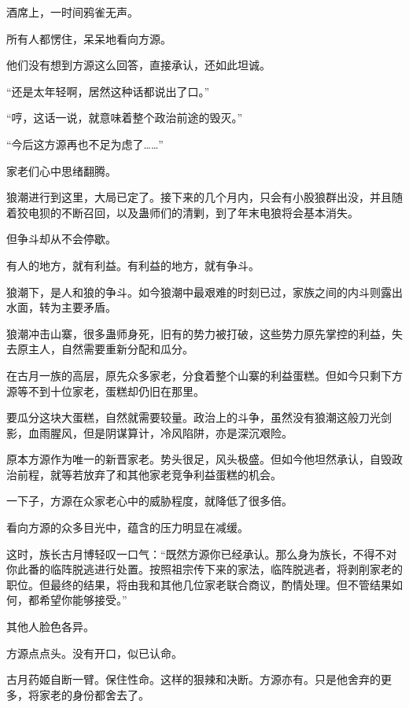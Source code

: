 
\begin{this_body}

酒席上，一时间鸦雀无声。

所有人都愣住，呆呆地看向方源。

他们没有想到方源这么回答，直接承认，还如此坦诚。

“还是太年轻啊，居然这种话都说出了口。”

“哼，这话一说，就意味着整个政治前途的毁灭。”

“今后这方源再也不足为虑了……”

家老们心中思绪翻腾。

狼潮进行到这里，大局已定了。接下来的几个月内，只会有小股狼群出没，并且随着狡电狈的不断召回，以及蛊师们的清剿，到了年末电狼将会基本消失。

但争斗却从不会停歇。

有人的地方，就有利益。有利益的地方，就有争斗。

狼潮下，是人和狼的争斗。如今狼潮中最艰难的时刻已过，家族之间的内斗则露出水面，转为主要矛盾。

狼潮冲击山寨，很多蛊师身死，旧有的势力被打破，这些势力原先掌控的利益，失去原主人，自然需要重新分配和瓜分。

在古月一族的高层，原先众多家老，分食着整个山寨的利益蛋糕。但如今只剩下方源等不到十位家老，蛋糕却仍旧在那里。

要瓜分这块大蛋糕，自然就需要较量。政治上的斗争，虽然没有狼潮这般刀光剑影，血雨腥风，但是阴谋算计，冷风陷阱，亦是深沉艰险。

原本方源作为唯一的新晋家老。势头很足，风头极盛。但如今他坦然承认，自毁政治前程，就等若放弃了和其他家老竞争利益蛋糕的机会。

一下子，方源在众家老心中的威胁程度，就降低了很多倍。

看向方源的众多目光中，蕴含的压力明显在减缓。

这时，族长古月博轻叹一口气：“既然方源你已经承认。那么身为族长，不得不对你此番的临阵脱逃进行处置。按照祖宗传下来的家法，临阵脱逃者，将剥削家老的职位。但最终的结果，将由我和其他几位家老联合商议，酌情处理。但不管结果如何，都希望你能够接受。”

其他人脸色各异。

方源点点头。没有开口，似已认命。

古月药姬自断一臂。保住性命。这样的狠辣和决断。方源亦有。只是他舍弃的更多，将家老的身份都舍去了。


\end{this_body}
